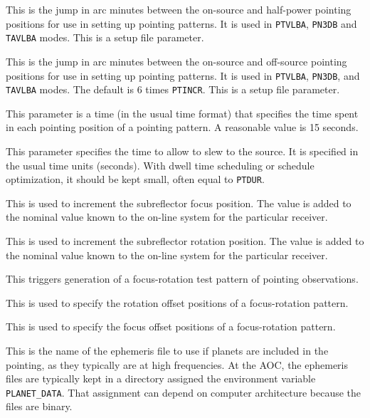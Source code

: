 \documentclass{report}
\begin{document}
\begin{list}{}{\parsep 0em  \itemsep 0em }
\item {} This is the jump in arc minutes
between the on-source and half-power pointing positions for use in
setting up pointing patterns.  It is used in {\tt PTVLBA}, {\tt PN3DB} and
{\tt TAVLBA} modes.  This is a setup file parameter.

\item {} This is the jump in arc minutes
between the on-source and off-source pointing positions for use in
setting up pointing patterns.  It is used in {\tt PTVLBA}, {\tt PN3DB},
and {\tt TAVLBA} modes.  The default is 6 times {\tt PTINCR}.
This is a setup file parameter.

\item {}  This parameter is a time (in
the usual time format) that specifies the time spent in each pointing
position of a pointing pattern.  A reasonable value is 15 seconds.

\item {}  This parameter specifies the
time to allow to slew to the source.  It is specified in the usual time
units (seconds).  With dwell time scheduling or schedule optimization,
it should be kept small, often equal to {\tt PTDUR}.

\item {}  This is used to increment the
subreflector focus position.  The value is added to the nominal value
known to the on-line system for the particular receiver.

\item {} This is used to increment
the subreflector rotation position.  The value is added to the nominal
value known to the on-line system for the particular receiver.

\item {}  This triggers generation
of a focus-rotation test pattern of pointing observations.

\item {}  This is used to specify
the rotation offset positions of a focus-rotation pattern.

\item {}  This is used to specify
the focus offset positions of a focus-rotation pattern.

\item {} This is the name of
the ephemeris file to use if planets are included in the pointing,
as they typically are at high frequencies.  At the AOC, the
ephemeris files are typically kept in a directory assigned the
environment variable {\tt PLANET\_DATA}.  That assignment can
depend on computer architecture because the files are binary.

\end{list}
\end{document}
